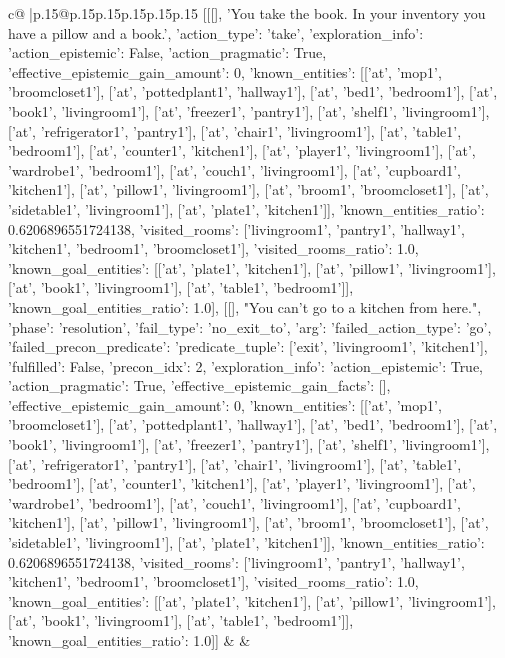 \documentclass{article}
\begin{document}
{\begin{supertabular}{c@{$\;$}|p{.15\linewidth}@{}p{.15\linewidth}p{.15\linewidth}p{.15\linewidth}p{.15\linewidth}p{.15\linewidth}}
{{{	 [[[], 'You take the book. In your inventory you have a pillow and a book.', {'action_type': 'take', 'exploration_info': {'action_epistemic': False, 'action_pragmatic': True, 'effective_epistemic_gain_amount': 0, 'known_entities': [['at', 'mop1', 'broomcloset1'], ['at', 'pottedplant1', 'hallway1'], ['at', 'bed1', 'bedroom1'], ['at', 'book1', 'livingroom1'], ['at', 'freezer1', 'pantry1'], ['at', 'shelf1', 'livingroom1'], ['at', 'refrigerator1', 'pantry1'], ['at', 'chair1', 'livingroom1'], ['at', 'table1', 'bedroom1'], ['at', 'counter1', 'kitchen1'], ['at', 'player1', 'livingroom1'], ['at', 'wardrobe1', 'bedroom1'], ['at', 'couch1', 'livingroom1'], ['at', 'cupboard1', 'kitchen1'], ['at', 'pillow1', 'livingroom1'], ['at', 'broom1', 'broomcloset1'], ['at', 'sidetable1', 'livingroom1'], ['at', 'plate1', 'kitchen1']], 'known_entities_ratio': 0.6206896551724138, 'visited_rooms': ['livingroom1', 'pantry1', 'hallway1', 'kitchen1', 'bedroom1', 'broomcloset1'], 'visited_rooms_ratio': 1.0, 'known_goal_entities': [['at', 'plate1', 'kitchen1'], ['at', 'pillow1', 'livingroom1'], ['at', 'book1', 'livingroom1'], ['at', 'table1', 'bedroom1']], 'known_goal_entities_ratio': 1.0}}], [[], "You can't go to a kitchen from here.", {'phase': 'resolution', 'fail_type': 'no_exit_to', 'arg': {'failed_action_type': 'go', 'failed_precon_predicate': {'predicate_tuple': ['exit', 'livingroom1', 'kitchen1'], 'fulfilled': False, 'precon_idx': 2}}, 'exploration_info': {'action_epistemic': True, 'action_pragmatic': True, 'effective_epistemic_gain_facts': [], 'effective_epistemic_gain_amount': 0, 'known_entities': [['at', 'mop1', 'broomcloset1'], ['at', 'pottedplant1', 'hallway1'], ['at', 'bed1', 'bedroom1'], ['at', 'book1', 'livingroom1'], ['at', 'freezer1', 'pantry1'], ['at', 'shelf1', 'livingroom1'], ['at', 'refrigerator1', 'pantry1'], ['at', 'chair1', 'livingroom1'], ['at', 'table1', 'bedroom1'], ['at', 'counter1', 'kitchen1'], ['at', 'player1', 'livingroom1'], ['at', 'wardrobe1', 'bedroom1'], ['at', 'couch1', 'livingroom1'], ['at', 'cupboard1', 'kitchen1'], ['at', 'pillow1', 'livingroom1'], ['at', 'broom1', 'broomcloset1'], ['at', 'sidetable1', 'livingroom1'], ['at', 'plate1', 'kitchen1']], 'known_entities_ratio': 0.6206896551724138, 'visited_rooms': ['livingroom1', 'pantry1', 'hallway1', 'kitchen1', 'bedroom1', 'broomcloset1'], 'visited_rooms_ratio': 1.0, 'known_goal_entities': [['at', 'plate1', 'kitchen1'], ['at', 'pillow1', 'livingroom1'], ['at', 'book1', 'livingroom1'], ['at', 'table1', 'bedroom1']], 'known_goal_entities_ratio': 1.0}}]] 
	  } 
	   } 
	   } 
	 & & \\ 
 


\end{supertabular}}
\end{document}
